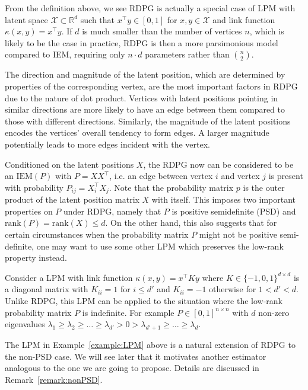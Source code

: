 From the definition above, we see RDPG is actually a special case of LPM with latent space $\mathcal{X} \subset \mathbb{R}^d$ such that $x^{\top} y \in [0, 1]$ for $x, y \in \mathcal{X}$ and link function $\kappa(x, y) = x^{\top} y$.
If $d$ is much smaller than the number of vertices $n$, which is likely to be the case in practice, RDPG is then a more parsimonious model compared to IEM, requiring only $n \cdot d$ parameters rather than $n \choose 2$.

The direction and magnitude of the latent position, which are determined by properties of the corresponding vertex, are the most important factors in RDPG due to the nature of dot product. Vertices with latent positions pointing in similar directions are more likely to have an edge between them compared to those with different directions. Similarly, the magnitude of the latent positions encodes the vertices' overall tendency to form edges. A larger magnitude potentially leads to more edges incident with the vertex.

Conditioned on the latent positions $X$, the RDPG now can be considered to be an $\mathrm{IEM}(P)$ with $P = X X^{\top}$, i.e. an edge between vertex $i$ and vertex $j$ is present with probability $P_{ij} = X_i^{\top} X_j$.
Note that the probability matrix $p$ is the outer product of the latent position matrix $X$ with itself. This imposes two important properties on $P$ under RDPG, namely that $P$ is positive semidefinite (PSD) and $\mathrm{rank}(P)=\mathrm{rank}(X)\leq d$. On the other hand, this also suggests that for certain circumstances when the probability matrix $P$ might not be positive semi-definite, one may want to use some other LPM which preserves the low-rank property instead.

\begin{example}
\label{example:LPM}
Consider a LPM with link function $\kappa(x, y) = x^{\top} K y$ where $K \in \{-1, 0, 1\}^{d \times d}$ is a diagonal matrix with $K_{ii} = 1$ for $i \le d'$ and $K_{ii} = -1$ otherwise for $1 < d' < d$.
Unlike RDPG, this LPM can be applied to the situation where the low-rank probability matrix $P$ is indefinite. For example $P \in [0, 1]^{n \times n}$ with $d$ non-zero eigenvalues $\lambda_1 \ge \lambda_2 \ge \dots \ge \lambda_{d'} > 0 > \lambda_{d'+1} \ge \dots \ge \lambda_d$.
\end{example}

The LPM in Example~\ref{example:LPM} above is a natural extension of RDPG to the non-PSD case. We will see later that it motivates another estimator analogous to the one we are going to propose. Details are discussed in Remark~\ref{remark:nonPSD}. 

